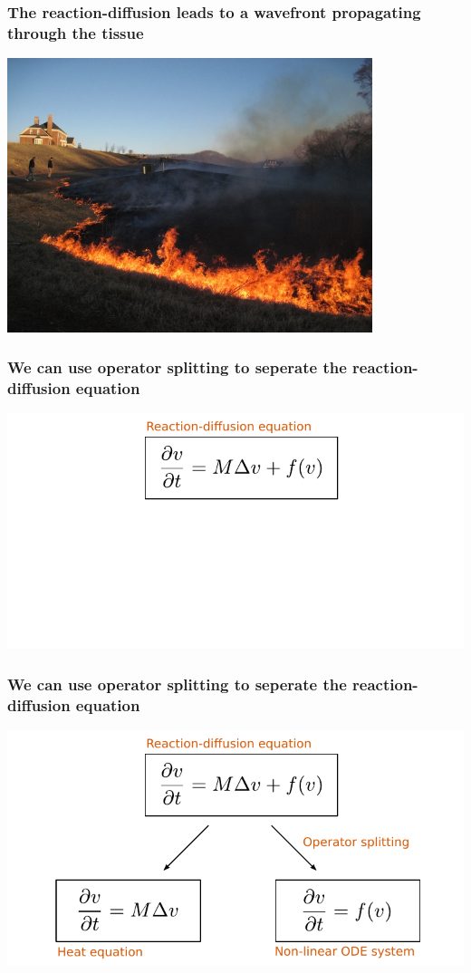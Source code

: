 \documentclass[norsk, 12pt]{beamer}
\begin{document}
\begin{frame}[fragile]
\frametitle{The reaction-diffusion leads to a wavefront propagating through the tissue}
\begin{center}
	\includegraphics[width=0.8\textwidth]{fire}
\end{center}
\end{frame}

\begin{frame}[fragile]
\frametitle{We can use operator splitting to seperate the reaction-diffusion equation}
\begin{center}
\includegraphics[width=\textwidth]{op_split0.pdf}
\end{center}
\end{frame}

\begin{frame}[fragile]
\frametitle{We can use operator splitting to seperate the reaction-diffusion equation}
\begin{center}
\includegraphics[width=\textwidth]{op_split1.pdf}
\end{center}
\end{frame}
\end{document}
